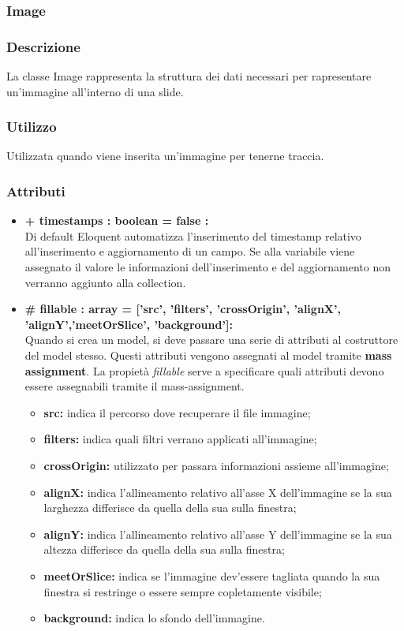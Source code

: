 \newpage
\subsubsection{Image}


	\subsubsection*{Descrizione}
	La classe Image rappresenta la struttura dei dati necessari per rapresentare un’immagine all’interno di una slide.
	
	\subsubsection*{Utilizzo}
	Utilizzata quando viene inserita un’immagine per tenerne traccia.
	
	\subsubsection*{Attributi}
	\begin{itemize}
		\item \textbf{+ timestamps : boolean = false :}\\
		Di default Eloquent automatizza l'inserimento del timestamp relativo all'inserimento e aggiornamento di un campo. Se alla variabile viene assegnato il valore le informazioni dell'inserimento e del aggiornamento non verranno aggiunto alla collection.
		\item \textbf{\# fillable : array = [’src’, ’filters’, ’crossOrigin’, ’alignX’, ’alignY’,’meetOrSlice’, ’background’]:}\\
		Quando si crea un model, si deve passare una serie di attributi al costruttore del model stesso. Questi attributi vengono assegnati al model tramite \textbf{mass assignment}. La propietà \textit{fillable} serve a specificare quali attributi devono essere assegnabili tramite il mass-assignment.
		\begin{itemize}
			\item \textbf{src:} indica il percorso dove recuperare il file immagine;
			\item \textbf{filters:} indica quali filtri verrano applicati all'immagine;
			\item \textbf{crossOrigin:} utilizzato per passara informazioni assieme all'immagine;
			\item \textbf{alignX:} indica l'allineamento relativo all'asse X dell'immagine se la sua larghezza differisce da quella della sua sulla finestra;
			\item \textbf{alignY:} indica l'allineamento relativo all'asse Y dell'immagine se la sua altezza differisce da quella della sua sulla finestra;
			\item \textbf{meetOrSlice:} indica se l'immagine dev'essere tagliata quando la sua finestra si restringe o essere sempre copletamente visibile;
			\item \textbf{background:} indica lo sfondo dell'immagine.
		\end{itemize}

	\end{itemize}

